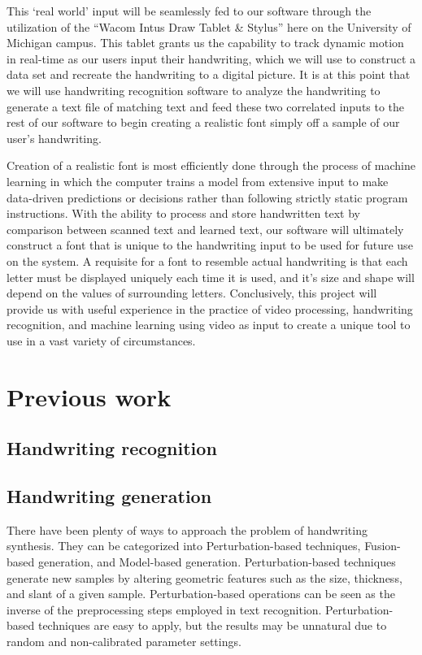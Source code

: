 \documentclass{article} %
\begin{document}
	This ‘real world’ input will be seamlessly fed to our software through the utilization of the “Wacom Intus Draw Tablet & Stylus” here on the University of Michigan campus. This tablet grants us the capability to track dynamic motion in real-time as our users input their handwriting, which we will use to construct a data set and recreate the handwriting to a digital picture. It is at this point that we will use handwriting recognition software to analyze the handwriting to generate a text file of matching text and feed these two correlated inputs to the rest of our software to begin creating a realistic font simply off a sample of our user’s handwriting. 

	Creation of a realistic font is most efficiently done through the process of machine learning in which the computer trains a model from extensive input to make data-driven predictions or decisions rather than following strictly static program instructions. With the ability to process and store handwritten text by comparison between scanned text and learned text, our software will ultimately construct a font that is unique to the handwriting input to be used for future use on the system. A requisite for a font to resemble actual handwriting is that each letter must be displayed uniquely each time it is used, and it’s size and shape will depend on the values of surrounding letters. Conclusively, this project will provide us with useful experience in the practice of video processing, handwriting recognition, and machine learning using video as input to create a unique tool to use in a vast variety of circumstances.
	
\section{Previous work}
\subsection{Handwriting recognition} %
\subsection{Handwriting generation} %
There have been plenty of ways to approach the problem of handwriting synthesis. They can be categorized into Perturbation-based techniques, Fusion-based generation, and Model-based generation. 
Perturbation-based techniques generate new samples by
altering geometric features such as the size, thickness, and
slant of a given sample. Perturbation-based operations can
be seen as the inverse of the preprocessing steps employed
in text recognition. Perturbation-based techniques are easy
to apply, but the results may be unnatural due to random and
non-calibrated parameter settings. 
\end{document}
